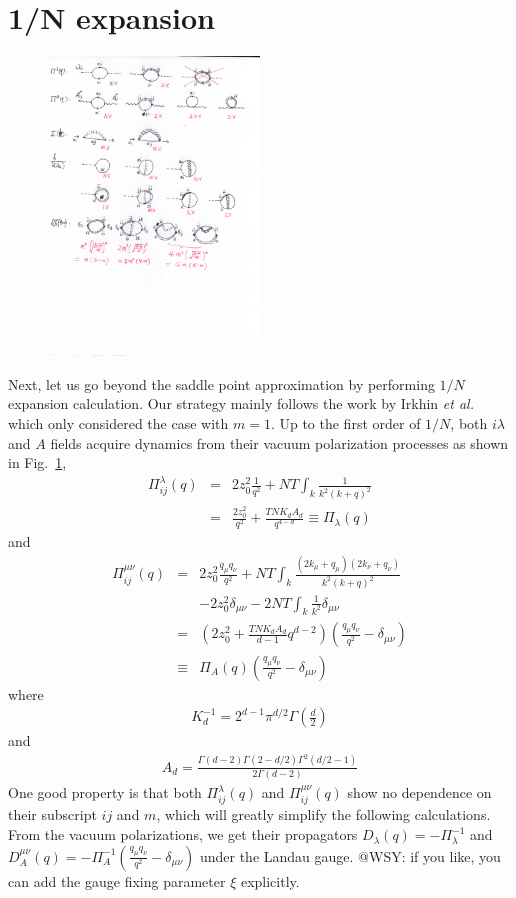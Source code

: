 \documentclass[aps,twocolumn,superscriptaddress]{revtex4-1}
\newcommand{\bea}{\begin{eqnarray}}
\newcommand{\eea}{\end{eqnarray}}
\newcommand{\etal}{\textit{et al.{ }}}
\begin{document}
\section{1/N expansion}
\begin{figure}
\includegraphics[width=0.5\textwidth]{1-N.png} %
\caption{\label{fig:self}}
\end{figure}
Next, let us go
beyond the saddle point approximation by performing $1/N$ expansion calculation. Our strategy mainly follows the work by
Irkhin \etal \cite{irkhin1996} which only considered the case with $m=1$. Up to the first order of $1/N$, both
$i\lambda$ and $A$ fields acquire dynamics from their vacuum polarization processes as shown in Fig.~\ref{fig:self},
\bea \Pi_{ij}^\lambda(q)&=&2z_0^2\frac{1}{q^2} + NT\int_k \frac{1}{k^2(k+q)^2} \nonumber\\
                        &=&\frac{2z_0^2}{q^2}+\frac{TNK_dA_d}{q^{4-d}} \equiv \Pi_\lambda(q) \eea and \bea
\Pi_{ij}^{\mu\nu}(q) &=& 2z_0^2 \frac{q_\mu q_\nu}{q^2} + NT\int_k \frac{(2k_\mu+q_\mu)(2k_\nu+q_\nu)}{k^2(k+q)^2}
\nonumber\\ && - 2z_0^2 \delta_{\mu\nu} -2NT\int_k \frac{1}{k^2}\delta_{\mu\nu}  \nonumber\\
            &=&\left(2z_0^2+\frac{TNK_dA_d}{d-1} q^{d-2}\right)\left(\frac{q_\mu q_\nu}{q^2}-\delta_{\mu\nu}\right)
\nonumber\\ &\equiv& \Pi_A(q)\left(\frac{q_\mu q_\nu}{q^2}-\delta_{\mu\nu}\right) \eea where \bea
K_d^{-1}=2^{d-1}\pi^{d/2}\Gamma\left(\frac{d}{2}\right) \eea and \bea
A_d=\frac{\Gamma(d-2)\Gamma(2-d/2)\Gamma^2(d/2-1)}{2\Gamma(d-2)} \eea One good property is that both
$\Pi_{ij}^\lambda(q)$ and $\Pi_{ij}^{\mu\nu}(q)$ show no dependence on their subscript $ij$ and $m$, which will greatly
simplify the following calculations. From the vacuum polarizations, we get their propagators
$D_\lambda(q)=-\Pi_\lambda^{-1}$ and $D_A^{\mu\nu}(q)=-\Pi_A^{-1}\left(\frac{q_\mu q_\nu}{q^2}-\delta_{\mu\nu}\right)$
under the Landau gauge. {\color{red} @WSY: if you like, you can add the gauge fixing parameter $\xi$ explicitly.}
\end{document}
